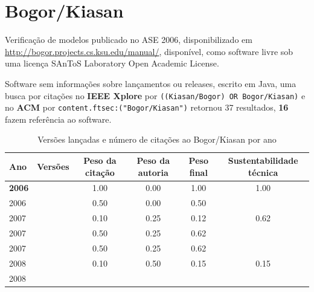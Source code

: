 \section{Bogor/Kiasan}

Verificação de modelos
publicado no ASE 2006,
disponibilizado em \url{http://bogor.projects.cs.ksu.edu/manual/},
disponível,
como software livre
sob uma licença SAnToS Laboratory Open Academic License.

Software sem informações sobre lançamentos ou releases,
escrito em Java,
uma busca por citações no {\bf IEEE Xplore} por
\texttt{((Kiasan/Bogor) OR Bogor/Kiasan)}
e no {\bf ACM} por
\texttt{content.ftsec:("Bogor/Kiasan")}
retornou
37 resultados,
{\bf 16} fazem referência ao software.


\begin{table}[H]
\caption{Versões lançadas e número de citações ao Bogor/Kiasan por ano}
\centering
\begin{tabular}{| l | c | c | c | c | c |}
  \hline
  Ano & Versões & Peso da citação & Peso da autoria & Peso final & Sustentabilidade técnica \\
  \hline
            {\bf 2006}
          &
          
          &
          1.00
          &
          0.00
          &
          1.00
          &
            {\color{blue} 1.00}
          \\
            2006
          &
          
          &
          0.50
          &
          0.00
          &
          0.50
          &
          \\
\hline
            2007
          &
          
          &
          0.10
          &
          0.25
          &
          0.12
          &
            {\color{blue} 0.62}
          \\
            2007
          &
          
          &
          0.50
          &
          0.25
          &
          0.62
          &
          \\
            2007
          &
          
          &
          0.50
          &
          0.25
          &
          0.62
          &
          \\
\hline
            2008
          &
          
          &
          0.10
          &
          0.50
          &
          0.15
          &
            {\color{red} 0.15}
          \\
            2008
          &
          

\end{tabular}
\end{table}
